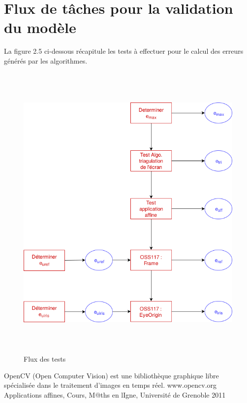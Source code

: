 \documentclass[a4paper, 12pt]{report}
\begin{document}
	\chapter*{Flux de tâches pour la validation du modèle}
	La figure 2.5 ci-dessous récapitule les tests à effectuer pour le calcul des erreurs générés par les algorithmes.
    \begin{figure}[!h]
    \centering\includegraphics[height=15cm]{Workflowtest.png}
    \caption{Flux des tests}
    \end{figure}
    \newpage
\begin{thebibliography}{}
OpenCV (Open Computer Vision) est une bibliothèque graphique libre spécialisée dans le traitement d'images en temps réel. www.opencv.org
Applications affines, Cours, M@ths en lIgne, Université de Grenoble 2011
\end{thebibliography}{}
\end{document}
